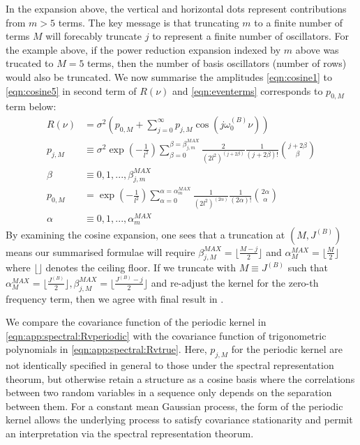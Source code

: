 In the expansion above, the vertical and horizontal dots represent contributions from $m>5$ terms. The key message is that truncating $m$ to a finite number of terms $M$ will forecably truncate $j$ to represent a finite number of oscillators. For the example above, if the power reduction expansion indexed by $m$ above was trucated to $M=5$ terms, then the  number of basis oscillators (number of rows) would also be truncated.  We now summarise the amplitudes \cref{eqn:cosine1} to  \cref{eqn:cosine5} in second term of $R(\nu)$ and  \cref{eqn:eventerms} corresponds to $p_{0,M}$ term below:
\begin{align}
R(\nu) &= \sigma^2 (p_{0,M} + \sum_{j=0}^{\infty} p_{j,M} \cos(j\omega_0^{(B)}  \nu)) \label{eqn:app:spectral:Rvperiodic}\\
p_{j,M} & \equiv \sigma^2 \exp (- \frac{1}{l^2}) \sum_{\beta = 0}^{\beta = \beta_{j,m}^{MAX}} \frac{2}{(2l^2)^{(j + 2\beta)}} \frac{1}{(j + 2\beta)!} \binom{j + 2\beta}{\beta} \label{eqn:beta_series2} \\
\beta &\equiv  0,1,..., \beta_{j,m}^{MAX}  \\
p_{0,M} &= \exp (- \frac{1}{l^2}) \sum_{\alpha = 0}^{\alpha = \alpha_{m}^{MAX}} \frac{1}{(2l^2)^{(2\alpha)}} \frac{1}{(2\alpha)!} \binom{2\alpha}{\alpha} \label{eqn:alpha_series}\\
\alpha &\equiv  0,1,..., \alpha_{m}^{MAX} 
\end{align}
By examining the cosine expansion, one sees that a truncation at $(M, J^{(B)} )$ means our summarised formulae will require $\beta_{j,M}^{MAX} = \lfloor\frac{M-j}{2}\rfloor$ and $\alpha_{M}^{MAX} = \lfloor\frac{M}{2}\rfloor$  where $\lfloor \rfloor$ denotes the ceiling floor. If we truncate with $M \equiv J^{(B)} $ such that $\alpha_{M}^{MAX} = \lfloor\frac{J^{(B)} }{2}\rfloor, \beta_{j,M}^{MAX} =  \lfloor\frac{J^{(B)}-j}{2}\rfloor $ and re-adjust the kernel for the zero-th frequency term, then we agree with final result in \cite{solin2014explicit}.

We compare the covariance function of the periodic kernel in \cref{eqn:app:spectral:Rvperiodic} with the covariance function of trigonometric polynomials in \cref{eqn:app:spectral:Rvtrue}.  Here, $p_{j,M}$ for the periodic kernel are not identically specified in general to those under the spectral representation theorum, but otherwise retain a structure as a cosine basis where the correlations between two random variables in a sequence only depends on the separation between them. For a constant mean Gaussian process, the form of the periodic kernel allows the underlying process to satisfy covariance stationarity and permit an interpretation via the spectral representation theorum.

